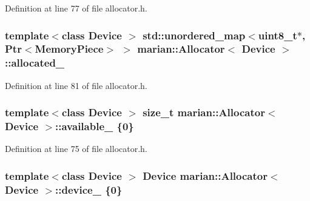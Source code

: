 Definition at line 77 of file allocator.\+h.

\subsubsection[{\texorpdfstring{allocated\+\_\+}{allocated_}}]{\setlength{\rightskip}{0pt plus 5cm}template$<$class Device $>$ std\+::unordered\+\_\+map$<$uint8\+\_\+t$\ast$, {\bf Ptr}$<${\bf Memory\+Piece}$>$ $>$ {\bf marian\+::\+Allocator}$<$ Device $>$\+::allocated\+\_\+\hspace{0.3cm}{\ttfamily [private]}}\hypertarget{classmarian_1_1Allocator_a26ed19566ebce33bdf4e6806566e7498}{}\label{classmarian_1_1Allocator_a26ed19566ebce33bdf4e6806566e7498}


Definition at line 81 of file allocator.\+h.

\subsubsection[{\texorpdfstring{available\+\_\+}{available_}}]{\setlength{\rightskip}{0pt plus 5cm}template$<$class Device $>$ size\+\_\+t {\bf marian\+::\+Allocator}$<$ Device $>$\+::available\+\_\+ \{0\}\hspace{0.3cm}{\ttfamily [private]}}\hypertarget{classmarian_1_1Allocator_afd4c68c5640f478ce3d370c6cf5b5078}{}\label{classmarian_1_1Allocator_afd4c68c5640f478ce3d370c6cf5b5078}


Definition at line 75 of file allocator.\+h.

\subsubsection[{\texorpdfstring{device\+\_\+}{device_}}]{\setlength{\rightskip}{0pt plus 5cm}template$<$class Device $>$ Device {\bf marian\+::\+Allocator}$<$ Device $>$\+::device\+\_\+ \{0\}\hspace{0.3cm}{\ttfamily [private]}}\hypertarget{classmarian_1_1Allocator_af67d68259655a2bb58926f57a18107d0}{}\label{classmarian_1_1Allocator_af67d68259655a2bb58926f57a18107d0}


